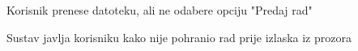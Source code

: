 \begin{packed_item}
\begin{packed_item}
							\item[5.a]  Korisnik prenese datoteku, ali ne odabere opciju "Predaj rad"
							\item[] \begin{packed_enum}
								
								\item Sustav javlja korisniku kako nije pohranio rad prije izlaska iz prozora
								
							\end{packed_enum}
							
						\end{packed_item}               
						
					\end{packed_item}
					
					\noindent {}
